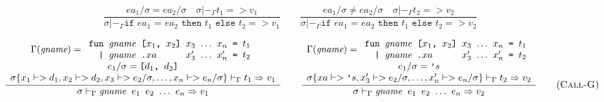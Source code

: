 \documentclass[10pt]{../sigplanconf}
\newcommand{\nfrac}[2]{\frac{\displaystyle{#1}}{\displaystyle{#2}}}
\newcommand{\tagsc}[1]{\tag{\scshape #1}}
\begin{document}
\begin{figure}\centering
  \begin{equation}
    \nfrac{
      ea_1/ \sigma = ea_2/\sigma \quad
      \sigma |-_\Gamma t_1 => v_1
    }{
      \sigma |-_\Gamma \texttt{if $ea_1$ = $ea_2$ then $t_1$ else $t_2$} => v_1
    }
    \qquad
    \nfrac{
      ea_1/ \sigma \neq ea_2/\sigma \quad
      \sigma |-_\Gamma t_2 => v_2
    }{
      \sigma |-_\Gamma \texttt{if $ea_1$ = $ea_2$ then $t_1$ else $t_2$} => v_2
    } \tagsc{If}
\end{equation}

\begin{equation}
\hspace{-0.7cm}
  \nfrac{
    \begin{array}{c}
      \Gamma(\textit{gname}) =
      \begin{array}{l}
        \texttt{fun \textit{\rmfamily gname} [$x_1$, $x_2$] $x_3$ $\ldots$ $x_n$ = $t_1$} \\
        \texttt{\ \ | \textit{\rmfamily gname}\ \texttt{.}$xa$ \hspace{.7cm} $x_3'$ $\ldots$ $x_n'$ = $t_2$} \\
      \end{array} \\
      e_1/\sigma = \texttt{[$d_1$, $d_2$]} \\
      \sigma\{x_1 |-> d_1, x_2 |-> d_2, x_3 |-> e_2/\sigma, \ldots, x_n |-> e_n/\sigma\} |-_\Gamma t_1 => v_1
    \end{array}
  }{
    \sigma |-_\Gamma \texttt{\textit{\rmfamily gname} $e_1$ $e_2$ $\ldots$ $e_n$} => v_1
  } 
\qquad
  \nfrac{
    \begin{array}{c}
      \Gamma(\textit{gname}) =
      \begin{array}{l}
        \texttt{fun \textit{\rmfamily gname} [$x_1$, $x_2$] $x_3$ $\ldots$ $x_n$ = $t_1$} \\
        \texttt{\ \ | \textit{\rmfamily gname}\ \texttt{.}$xa$ \hspace{.7cm} $x_3'$ $\ldots$ $x_n'$ = $t_2$} \\
      \end{array} \\
      e_1/\sigma = \texttt{'$s$} \\
      \sigma\{xa |-> \texttt{'}s, x_3' |-> e_2/\sigma, \ldots, x_n' |-> e_n/\sigma\} |-_\Gamma t_2 => v_2
    \end{array}
  }{
    \sigma |-_\Gamma \texttt{\textit{\rmfamily gname} $e_1$ $e_2$ $\ldots$ $e_n$} => v_2
  } \tagsc{Call-G}
\end{equation}


\end{figure}
\end{document}
